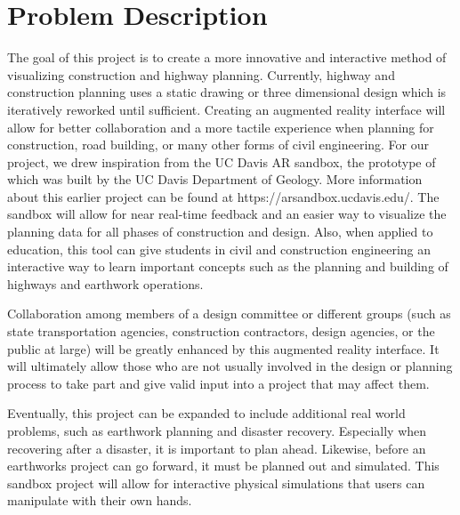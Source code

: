\documentclass[onecolumn, draftclsnofoot,10pt, compsoc]{IEEEtran}
\begin{document}
\newpage
{}
\tableofcontents
\clearpage

\section{Problem Description}
The goal of this project is to create a more innovative and interactive method of visualizing construction and highway planning.
Currently, highway and construction planning uses a static drawing or three dimensional design which is iteratively reworked until sufficient.
Creating an augmented reality interface will allow for better collaboration and a more tactile experience when planning for construction, road building, or many other forms of civil engineering.
For our project, we drew inspiration from the UC Davis AR sandbox, the prototype of which was built by the UC Davis Department of Geology. More information about this earlier project can be found at https://arsandbox.ucdavis.edu/.
The sandbox will allow for near real-time feedback and an easier way to visualize the planning data for all phases of construction and design.
Also, when applied to education, this tool can give students in civil and construction engineering an interactive way to learn important concepts such as the planning and building of highways and earthwork operations.
\par
Collaboration among members of a design committee or different groups (such as state transportation agencies, construction contractors, design agencies, or the public at large) will be greatly enhanced by this augmented reality interface.
It will ultimately allow those who are not usually involved in the design or planning process to take part and give valid input into a project that may affect them.
\par
Eventually, this project can be expanded to include additional real world  problems, such as earthwork planning and disaster recovery.
Especially when recovering after a disaster, it is important to plan ahead. Likewise, before an earthworks project can go forward, it must be planned out and simulated.
This sandbox project will allow for interactive physical simulations that users can manipulate with their own hands.
\end{document}
